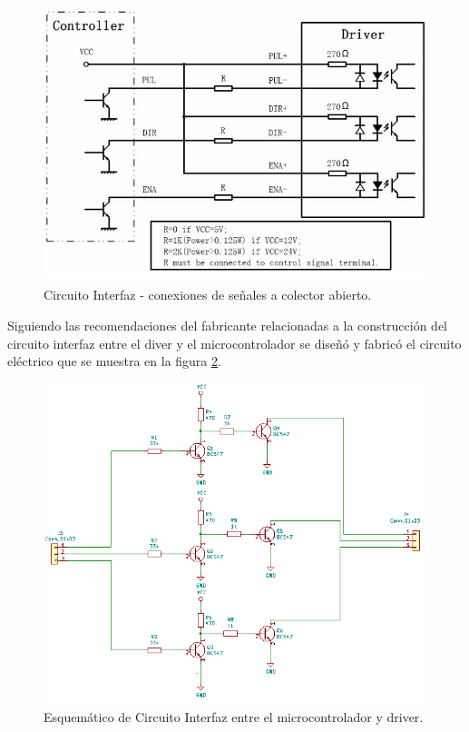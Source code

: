 \begin{figure}[htpb]
\centering
\includegraphics[scale=.65]{./Figures/circuitointerfaz-driver.jpeg}
\caption{Circuito Interfaz - conexiones de señales a colector abierto.}
\label{fig:circuito interfaz}
\end{figure}

Siguiendo las recomendaciones del fabricante relacionadas a la construcción del circuito interfaz entre el diver y el microcontrolador se diseñó y fabricó el circuito eléctrico que se muestra en la figura \ref{fig:esquemático circuito interfaz}.

\begin{figure} [htpb]
\centering
\includegraphics[scale=.85]{./Figures/esquematico-circuito-interfaz.png}
\caption{Esquemático de Circuito Interfaz entre el microcontrolador y driver.}
\label{fig:esquemático circuito interfaz}
\end{figure}

